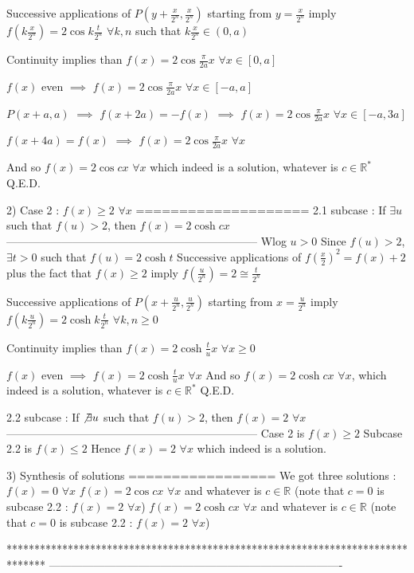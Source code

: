 \begin{solution}
Successive applications of $P(y+\frac x{2^n},\frac x{2^n})$ starting from $y=\frac x{2^n}$ imply $f(k\frac x{2^n})=2\cos k\frac t{2^n}$ $\forall k,n$ such that $k\frac x{2^n}\in (0,a)$

Continuity implies than $f(x)=2\cos \frac{\pi}{2a}x$ $\forall x\in[0,a]$

$f(x)$ even $\implies$ $f(x)=2\cos \frac{\pi}{2a}x$ $\forall x\in[-a,a]$

$P(x+a,a)$ $\implies$ $f(x+2a)=-f(x)$ $\implies$ $f(x)=2\cos \frac{\pi}{2a}x$ $\forall x\in[-a,3a]$

$f(x+4a)=f(x)$ $\implies$ $f(x)=2\cos \frac{\pi}{2a}x$ $\forall x$

And so $\boxed{f(x)=2\cos cx}$ $\forall x$ which indeed is a solution, whatever is $c\in\mathbb R^*$
Q.E.D.

2) Case 2 : $f(x)\ge 2$ $\forall x$
====================
2.1 subcase : If  $\exists u$ such that $f(u)>2$, then $f(x)=2\cosh cx$
--------------------------------------------------------------------
Wlog $u>0$
Since $f(u)>2$, $\exists t>0$ such that $f(u)=2\cosh t$
Successive applications of $f(\frac x2)^2=f(x)+2$ plus the fact that $f(x)\ge 2$ imply $f(\frac u{2^n})=2\cong \frac t{2^n}$

Successive applications of $P(x+\frac u{2^n},\frac u{2^n})$ starting from $x=\frac u{2^n}$ imply $f(k\frac u{2^n})=2\cosh k\frac t{2^n}$ $\forall k,n\ge 0$

Continuity implies than $f(x)=2\cosh \frac tu x$ $\forall x\ge 0$

$f(x)$ even $\implies$ $f(x)=2\cosh  \frac tu x$ $\forall x$
And so $\boxed{f(x)=2\cosh cx}$ $\forall x$, which indeed is a solution, whatever is $c\in\mathbb R^*$
Q.E.D.

2.2 subcase : If  $\not \exists u$ such that $f(u)>2$, then $f(x)=2$ $\forall x$
--------------------------------------------------------------------
Case 2 is $f(x)\ge 2$
Subcase 2.2 is $f(x)\le 2$
Hence $\boxed{f(x)=2}$ $\forall x$ which indeed is a solution.

3) Synthesis of solutions
=================
We got three solutions :
$f(x)=0$ $\forall x$
$f(x)=2\cos cx$ $\forall x$ and whatever is $c\in\mathbb R$ (note that $c=0$ is subcase 2.2 : $f(x)=2$ $\forall x$)
$f(x)=2\cosh cx$ $\forall x$ and whatever is $c\in\mathbb R$ (note that $c=0$ is subcase 2.2 : $f(x)=2$ $\forall x$)
\end{solution}
*******************************************************************************
-------------------------------------------------------------------------------

